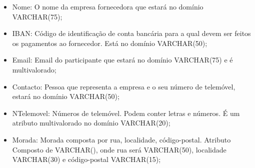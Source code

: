 \documentclass[a4paper,12pt]{scrreprt}
\begin{document}
\begin{itemize}
\begin{itemize}
                     \item{Nome:} O nome da empresa fornecedora que estará no domínio VARCHAR(75);
                       
                     \item{IBAN:} Código de identificação de conta bancária para a qual devem ser feitos os pagamentos ao fornecedor. Está no domínio VARCHAR(50);
                       
                     \item{Email:} Email do participante que estará no domínio VARCHAR(75) e é multivalorado;
                       
                     \item{Contacto:} Pessoa que representa a empresa e o seu número de telemóvel, estará no domínio VARCHAR(50);
                       
                     \item{NTelemovel:} Números de telemóvel. Podem conter letras e números. É um atributo multivalorado no domínio VARCHAR(20);
                       
                     \item{Morada:} Morada composta por rua, localidade, código-postal. Atributo Composto de VARCHAR(), onde rua será VARCHAR(50), localidade VARCHAR(30) e código-postal VARCHAR(15);
                       
                     \end{itemize}
             \end{itemize}
\end{document}
